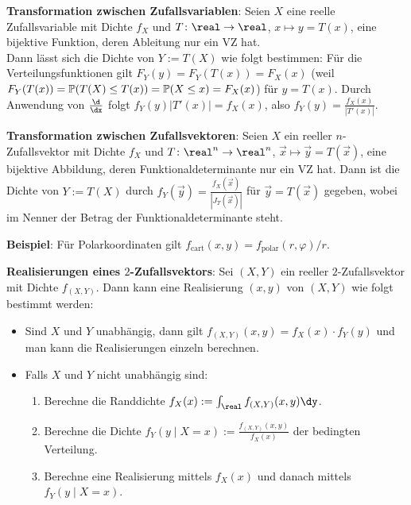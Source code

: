 \linie

\textbf{Transformation zwischen Zufallsvariablen}:
Seien $X$ eine reelle Zufallsvariable mit Dichte $f_X$ und
$T\colon \real \to \real$, $x \mapsto y = T(x)$, eine bijektive
Funktion, deren Ableitung nur ein VZ hat.\\
Dann lässt sich die Dichte von $Y := T(X)$ wie folgt bestimmen:
Für die Verteilungsfunktionen gilt $F_Y(y) = F_Y(T(x)) = F_X(x)$
(weil $F_Y(T(x)) = \mathbb{P}(T(X) \le T(x)) = \mathbb{P}(X \le x) = F_X(x)$) für $y = T(x)$.
Durch Anwendung von $\frac{\d}{\dx}$ folgt $f_Y(y) |T'(x)| = f_X(x)$,
also $f_Y(y) = \frac{f_X(x)}{|T'(x)|}$.

\textbf{Transformation zwischen Zufallsvektoren}:
Seien $X$ ein reeller $n$-Zufallsvektor mit Dichte $f_X$ und
$T\colon \real^n \to \real^n$, $\vec{x} \mapsto \vec{y} = T(\vec{x})$, eine bijektive
Abbildung, deren Funktionaldeterminante nur ein VZ hat.
Dann ist die Dichte von $Y := T(X)$ durch $f_Y(\vec{y}) = \frac{f_X(\vec{x})}{|J_T(\vec{x})|}$
für $\vec{y} = T(\vec{x})$ gegeben, wobei im Nenner der Betrag der Funktionaldeterminante steht.

\textbf{Beispiel}:
Für Polarkoordinaten gilt
$f_{\text{cart}}(x, y) = f_{\text{polar}}(r, \varphi) / r$.

\linie

\textbf{Realisierungen eines $2$-Zufallsvektors}:
Sei $(X, Y)$ ein reeller $2$-Zufallsvektor mit Dichte $f_{(X,Y)}$.
Dann kann eine Realisierung $(x, y)$ von $(X, Y)$ wie folgt bestimmt werden:
\begin{itemize}
    \item
    Sind $X$ und $Y$ unabhängig, dann gilt $f_{(X,Y)}(x, y) = f_X(x) \cdot f_Y(y)$
    und man kann die Realisierungen einzeln berechnen.

    \item
    Falls $X$ und $Y$ nicht unabhängig sind:
    \begin{enumerate}
        \item
        Berechne die Randdichte $f_X(x) := \int_\real f_{(X,Y)}(x, y) \dy$.

        \item
        Berechne die Dichte $f_Y(y\;|\;X=x) := \frac{f_{(X,Y)}(x, y)}{f_X(x)}$
        der bedingten Verteilung.

        \item
        Berechne eine Realisierung mittels $f_X(x)$ und danach mittels $f_Y(y\;|\;X=x)$.
    \end{enumerate}
\end{itemize}

